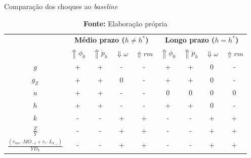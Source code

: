 \begin{table}[H]
	\centering
	\caption{Comparação dos choques ao \textit{baseline}}
	\label{ResumoChoques}
		\begin{tabular}{c|c|c|c|c||c|c|c|c}
			\hline\hline
			\multirow{2}{*}{} & \multicolumn{4}{c||}{\textbf{Médio prazo ($h \neq h^*$)}} & \multicolumn{4}{c}{\textbf{Longo prazo ($h = h^*$)}} \\ \cline{2-9} 
			& \textbf{$\Uparrow \phi_0$} & \textbf{$\Uparrow \dot p_h$} & \textbf{$\Downarrow \omega$} & \textbf{$\Uparrow rm$} & \textbf{$\Uparrow \phi_0$} & \textbf{$\Uparrow \dot p_h$} & \textbf{$\Downarrow \omega$} & \textbf{$\Uparrow rm$} \\ \hline
			\textbf{$g$} & + & + & - & - & + & + & 0 & - \\ \hline
			\textbf{$g_Z$} & + & + & 0 & - & + & + & 0 & - \\ \hline
			\textbf{$u$} & + & + & - & - & 0 & 0 & 0 & 0 \\ \hline
			\textbf{$h$} & + & + & - & - & + & + & 0 & - \\ \hline
			\textbf{$k$} & - & - & + & + & - & - & + & + \\ \hline
			\textbf{$\frac{Z}{Y}$} & - & - & + & + & - & - & + & + \\ \hline
			\textit{$\frac{(r_{mo}\cdot MO_{-1} + r_l\cdot L_{k_{-1}})}{YD_k}$} & - & - & + & + & - & - & + & + \\ \hline\hline
		\end{tabular}%
	\caption*{\textbf{Fonte:} Elaboração própria}
\end{table}


